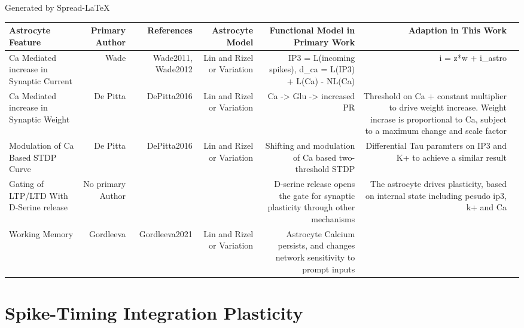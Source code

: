 \begin{adjustwidth}{-2.5 cm}{-2.5 cm}\centering\begin{threeparttable}[!htb]
\caption{Generated by Spread-LaTeX}\label{table:obj2_astro_features}
\scriptsize
\begin{tabular}{lrrrrrr}\toprule
Astrocyte Feature &Primary Author &References &Astrocyte Model &Functional Model in Primary Work &Adaption in This Work \\\midrule
Ca Mediated increase in Synaptic Current &Wade &Wade2011, Wade2012 &Lin and Rizel or Variation &IP3 = L(incoming spikes), d\_ca = L(IP3) + L(Ca) - NL(Ca) &i = z*w + i\_astro \\
Ca Mediated increase in Synaptic Weight &De Pitta &DePitta2016 &Lin and Rizel or Variation &Ca -> Glu -> increased PR &Threshold on Ca + constant multiplier to drive weight increase. Weight incrase is proportional to Ca, subject to a maximum change and scale factor \\
Modulation of Ca Based STDP Curve &De Pitta &DePitta2016 &Lin and Rizel or Variation &Shifting and modulation of Ca based two-threshold STDP &Differential Tau paramters on IP3 and K+ to achieve a similar result \\
Gating of LTP/LTD With D-Serine release &No primary Author & & &D-serine release opens the gate for synaptic plasticity through other mechanisms &The astrocyte drives plasticity, based on internal state including pesudo ip3, k+ and Ca \\
Working Memory &Gordleeva &Gordleeva2021 &Lin and Rizel or Variation &Astrocyte Calcium persists, and changes network sensitivity to prompt inputs & \\
\bottomrule
\end{tabular}
\end{threeparttable}\end{adjustwidth}


\section{Spike-Timing Integration Plasticity}

